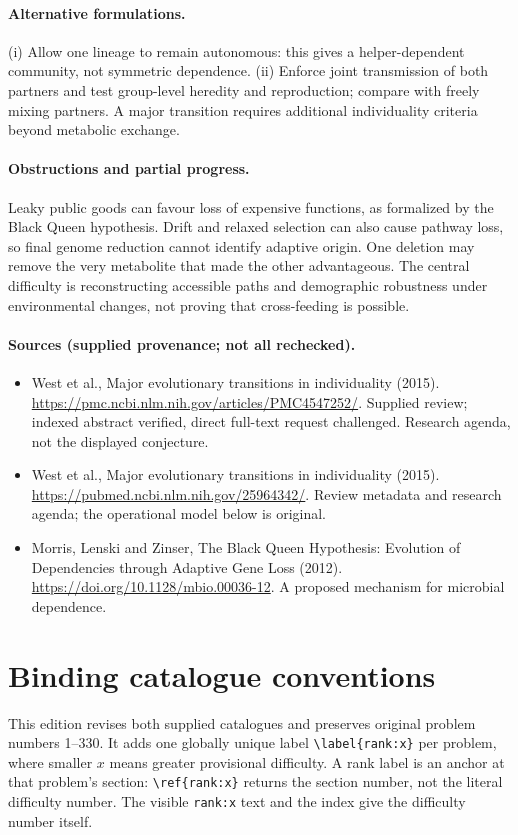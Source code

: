\documentclass[11pt]{article}
\begin{document}
\paragraph{Alternative formulations.} (i) Allow one lineage to remain autonomous: this gives a helper-dependent community, not symmetric dependence. (ii) Enforce joint transmission of both partners and test group-level heredity and reproduction; compare with freely mixing partners. A major transition requires additional individuality criteria beyond metabolic exchange.
\paragraph{Obstructions and partial progress.} Leaky public goods can favour loss of expensive functions, as formalized by the Black Queen hypothesis. Drift and relaxed selection can also cause pathway loss, so final genome reduction cannot identify adaptive origin. One deletion may remove the very metabolite that made the other advantageous. The central difficulty is reconstructing accessible paths and demographic robustness under environmental changes, not proving that cross-feeding is possible.
\paragraph{Sources (supplied provenance; not all rechecked).}
\begin{itemize}
\item West et al., Major evolutionary transitions in individuality (2015). \url{https://pmc.ncbi.nlm.nih.gov/articles/PMC4547252/}. Supplied review; indexed abstract verified, direct full-text request challenged. Research agenda, not the displayed conjecture.
\item West et al., Major evolutionary transitions in individuality (2015). \url{https://pubmed.ncbi.nlm.nih.gov/25964342/}. Review metadata and research agenda; the operational model below is original.
\item Morris, Lenski and Zinser, The Black Queen Hypothesis: Evolution of Dependencies through Adaptive Gene Loss (2012). \url{https://doi.org/10.1128/mbio.00036-12}. A proposed mechanism for microbial dependence.
\end{itemize}


\section*{Binding catalogue conventions}
This edition revises both supplied catalogues and preserves original problem numbers 1--330. It adds one globally unique label \verb|\label{rank:x}| per problem, where smaller $x$ means greater provisional difficulty. A rank label is an anchor at that problem's section: \verb|\ref{rank:x}| returns the section number, not the literal difficulty number. The visible \texttt{rank:x} text and the index give the difficulty number itself.
\end{document}
